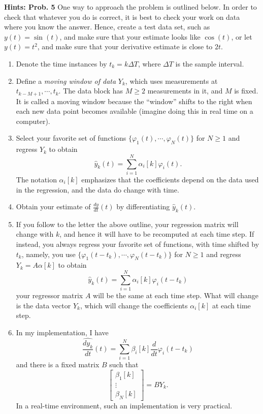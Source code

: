 \documentclass[letterpaper]{article}
\begin{document}
\noindent \textbf{Hints: Prob. 5 } One way to approach the problem is outlined below. In order to check that whatever you do is correct, it is best to check your work on data where you know the answer. Hence, create a test data set, such as $y(t) = \sin(t)$, and make sure that your estimate looks like $\cos(t)$, or let $y(t) = t^2$, and make sure that your derivative estimate is close to  $2t$.
 \begin{enumerate}
\setlength{\itemsep}{.1in}
\renewcommand{\labelenumi}{(\alph{enumi})}

\item Denote the time instances by $t_k = k \Delta T$, where $\Delta T$ is the sample interval. %

\item Define a \textit{moving window of data} $Y_k$, which uses measurements at $t_{k-M+1}, \cdots, t_k$. The data block has $M \ge 2$ measurements in it, and $M$ is fixed. It is called a moving window because the ``window'' shifts to the right when each new data point becomes available (imagine doing this in real time on a computer).

\item  Select your favorite set of functions $\{\varphi_1(t), \cdots, \varphi_N(t) \}$ for $N\ge 1$ and regress $Y_k$ to obtain
$$ \hat{y}_k(t) = \sum_{i=1}^N \alpha_i[k] \varphi_i(t).$$
The notation $\alpha_i[k] $ emphasizes that the coefficients depend on the data used in the regression, and the data do change with time.

\item Obtain your estimate of $\frac{dy}{dt}(t)$ by differentiating $\hat{y}_k(t)$.

\item If you follow to the letter the above outline, your regression matrix will change with $k$, and hence it will have to be recomputed at each time step. If instead, you always regress your favorite set of functions, with time shifted by $t_k$, namely, you use $\{\varphi_1(t-t_k), \cdots, \varphi_N(t-t_k) \}$ for $N\ge 1$ and regress $Y_k = A \alpha[k]$ to obtain
$$ \widehat{y}_k(t) = \sum_{i=1}^N \alpha_i[k] \varphi_i(t-t_k)$$
your regressor matrix $A$ will be the same at each time step. What will change is the data vector $Y_k$, which will change the coefficients $\alpha_i[k]$ at each time step.

\item In my implementation, I have
$$ \widehat{\frac{dy_k}{dt}}(t) = \sum_{i=1}^N \beta_i[k] \frac{d}{dt}\varphi_i(t-t_k)$$
and there is a fixed matrix $B$ such that
$$ \begin{bmatrix}  \beta_1[k] \\ \vdots \\ \beta_N[k] \end{bmatrix} = B Y_k. $$
In a real-time environment, such an implementation is very practical.


\end{enumerate}
\end{document}
